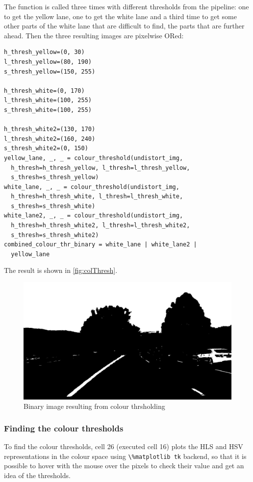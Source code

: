 \documentclass{article}
\let\cd\lstinline
\begin{document}
The function is called three times with different thresholds from the pipeline: one to get the yellow lane, one to get the white lane and a third time to get some other parts of the white lane that are difficult to find, the parts that are further ahead. Then the three resulting images are pixelwise ORed:
\begin{lstlisting}
h_thresh_yellow=(0, 30)
l_thresh_yellow=(80, 190)
s_thresh_yellow=(150, 255)

h_thresh_white=(0, 170)
l_thresh_white=(100, 255)
s_thresh_white=(100, 255)

h_thresh_white2=(130, 170)
l_thresh_white2=(160, 240)
s_thresh_white2=(0, 150)
yellow_lane, _, _ = colour_threshold(undistort_img, 
  h_thresh=h_thresh_yellow, l_thresh=l_thresh_yellow,
  s_thresh=s_thresh_yellow)
white_lane, _, _ = colour_threshold(undistort_img, 
  h_thresh=h_thresh_white, l_thresh=l_thresh_white,
  s_thresh=s_thresh_white)
white_lane2, _, _ = colour_threshold(undistort_img, 
  h_thresh=h_thresh_white2, l_thresh=l_thresh_white2,
  s_thresh=s_thresh_white2)
combined_colour_thr_binary = white_lane | white_lane2 |
  yellow_lane
\end{lstlisting}
The result is shown in \autoref{fig:colThresh}.
\begin{figure}
\centering
\includegraphics[scale=0.25]{output_images/test1/5_col_threshold_bin}
\caption{Binary image resulting from colour thrsholding}
\label{fig:colThresh}
\end{figure}

\subsubsection{Finding the colour thresholds}
To find the colour thresholds, cell 26 (executed cell 16) plots the HLS and HSV representations in the colour space using \cd+\%matplotlib tk+ backend, so that it is possible to hover with the mouse over the pixels to check their value and get an idea of the thresholds.
\end{document}
